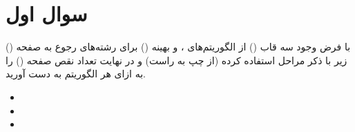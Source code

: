 \section{سوال اول}



با فرض وجود سه قاب () از الگوریتم‌های ،  و بهینه () برای رشته‌های رجوع به صفحه () زیر با ذکر مراحل استفاده کرده (از چپ به راست) و در نهایت تعداد نقص صفحه () را به ازای هر الگوریتم به دست آورید.

\begin{latin}
	\begin{itemize}
		\item {}
		\item {}
		\item {}
	\end{itemize}
	
\end{latin}





